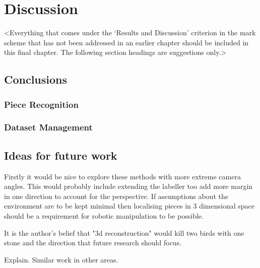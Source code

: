 \chapter{Discussion}
\label{conclusions}

<Everything that comes under the `Results and Discussion' criterion in the mark scheme that has not been addressed in an earlier chapter should be included in this final chapter. The following section headings are suggestions only.>

\section{Conclusions}

\subsection{Piece Recognition}

\subsection{Dataset Management}

\section{Ideas for future work}
Firstly it would be nice to explore these methods with more extreme camera angles.  This would probably include extending the labeller too add more 
margin in one direction to account for the perspective. If assumptions about the environment are to be kept minimal
then localising pieces in 3 dimensional space should be a requirement for robotic manipulation to be possible.

It is the author's belief that "3d reconstruction" would kill two birds with one stone and the direction that future research should focus.

Explain.  Similar work in other areas.